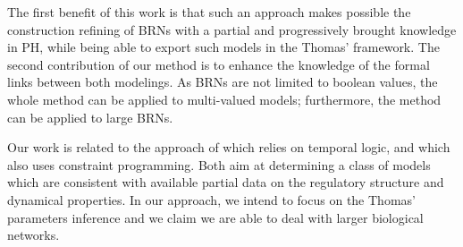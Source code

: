 The first benefit of this work is that such an approach makes possible the construction refining of BRNs with a partial and progressively brought knowledge in PH, while being able to export such models in the Thomas' framework.
The second contribution of our method is to enhance the knowledge of the formal links between both modelings.
As BRNs are not limited to boolean values, the whole method can be applied to multi-valued models;
furthermore, the method can be applied to large BRNs.

Our work is related to the approach of \cite{Khalis09} which relies on temporal logic, and \cite{20646302,DBLP:conf/ipcat/CorblinFTCT12} which also uses constraint programming. Both aim at determining a class of models which are consistent with available partial data on the regulatory structure and dynamical properties.
In our approach, we intend to focus on the Thomas' parameters inference and we claim we are able to deal with larger biological networks.

\begin{comment}
\paragraph{Outline.}
\pref{sec:frameworks} recalls the PH and Thomas frameworks;
\pref{sec:infer-IG} defines the IG inference from PH;
\pref{sec:infer-K} details the enumeration of Thomas parametrizations compatible with a PH;
\pref{sec:examples} gives some information about the implementation of the method.
\end{comment}
